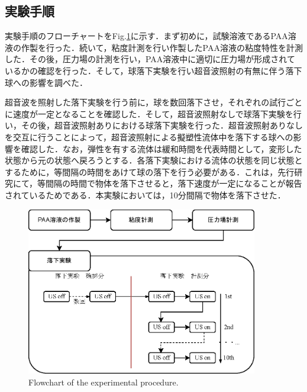 \subsection{実験手順}

実験手順のフローチャートをFig.\ref{fig:exp-methods}に示す．まず初めに，試験溶液であるPAA溶液の作製を行った．続いて，粘度計測を行い作製したPAA溶液の粘度特性を計測した．その後，圧力場の計測を行い，PAA溶液中に適切に圧力場が形成されているかの確認を行った．そして，球落下実験を行い超音波照射の有無に伴う落下球への影響を調べた．

超音波を照射した落下実験を行う前に，球を数回落下させ，それぞれの試行ごとに速度が一定となることを確認した．そして，超音波照射なしで球落下実験を行い，その後，超音波照射ありにおける球落下実験を行った．超音波照射ありなしを交互に行うことによって，超音波照射による擬塑性流体中を落下する球への影響を確認した．なお，弾性を有する流体は緩和時間を代表時間として，変形した状態から元の状態へ戻ろうとする．各落下実験における流体の状態を同じ状態とするために，等間隔の時間をあけて球の落下を行う必要がある．これは，先行研究\cite{ref:8-5}にて，等間隔の時間で物体を落下させると，落下速度が一定になることが報告されているためである．本実験においては，10分間隔で物体を落下させた．

\begin{figure}[ht]
    \centering
    \includegraphics[width=0.9\textwidth]{2-Methods/exp-methods.eps}
    \caption{Flowchart of the experimental procedure.}
    \label{fig:exp-methods}
\end{figure}
